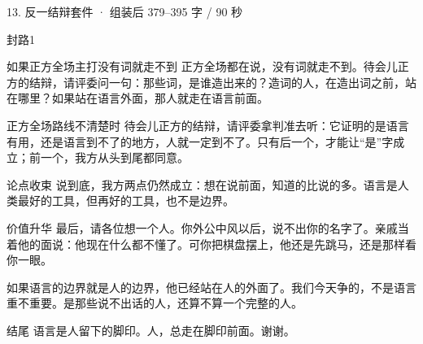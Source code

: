 \documentclass[script,con]{debate}
\begin{document}
\begin{kit}{13. 反一结辩}{套件 · 组装后 379–395 字 / 90 秒}
\begin{pick}{封路}{1}
\begin{module}{如果正方全场主打没有词就走不到}
正方全场都在说，没有词就走不到。待会儿正方的结辩，请评委问一句：那些词，是谁造出来的？造词的人，在造出词之前，站在哪里？如果站在语言外面，那人就走在语言前面。
\end{module}
\begin{fallback}{正方全场路线不清楚时}
待会儿正方的结辩，请评委拿判准去听：它证明的是语言有用，还是语言到不了的地方，人就一定到不了。只有后一个，才能让“是”字成立；前一个，我方从头到尾都同意。
\end{fallback}
\end{pick}
\begin{fixed}{论点收束}
说到底，我方两点仍然成立：想在说前面，知道的比说的多。语言是人类最好的工具，但再好的工具，也不是边界。
\end{fixed}
\begin{fixed}{价值升华}
最后，请各位想一个人。你外公中风以后，说不出你的名字了。亲戚当着他的面说：他现在什么都不懂了。可你把棋盘摆上，他还是先跳马，还是那样看你一眼。

如果语言的边界就是人的边界，他已经站在人的外面了。我们今天争的，不是语言重不重要。是那些说不出话的人，还算不算一个完整的人。
\end{fixed}
\begin{fixed}{结尾}
语言是人留下的脚印。人，总走在脚印前面。谢谢。
\end{fixed}
\end{kit}
\begin{contingency}
\end{contingency}
\end{document}
